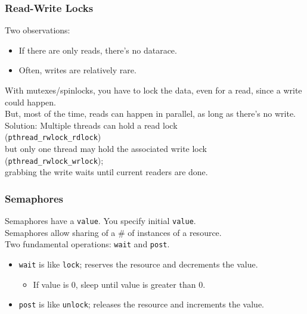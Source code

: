 \documentclass[aspectratio=43]{beamer}
\newenvironment{changemargin}[1]{%
  \begin{list}{}{%
    \setlength{\topsep}{0pt}%
    \setlength{\leftmargin}{#1}%
    \setlength{\rightmargin}{1em}
    \setlength{\listparindent}{\parindent}%
    \setlength{\itemindent}{\parindent}%
    \setlength{\parsep}{\parskip}%
  }%
  \item[]}{\end{list}}
\begin{document}
\begin{frame}
  \frametitle{Read-Write Locks}

  \begin{changemargin}{2.5cm}
  Two observations:
  \begin{itemize}
    \item If there are only reads, there's no datarace.
    \item Often, writes are relatively rare.
  \end{itemize}
  With mutexes/spinlocks, you have to lock the data, even for a read,
      since a write could happen.\\[1em]

  But, most of the time, reads can happen in parallel, as long as
      there's no write.\\[1em]

  Solution: Multiple threads can hold a read lock\\ \hspace*{2em} ({\tt pthread\_rwlock\_rdlock})\\
      but only one thread may hold the associated write lock\\ \hspace*{2em} ({\tt pthread\_rwlock\_wrlock});\\
      grabbing the write waits until  current readers are done.
  \end{changemargin}
\end{frame}

\begin{frame}
  \frametitle{Semaphores}

  \begin{changemargin}{2cm}
    Semaphores have a {\tt value}.
      You specify initial {\tt value}.\\[1em]
    Semaphores allow sharing of a \# of instances of a resource.\\[1em]
    Two fundamental operations: {\tt wait} and {\tt post}.\\[1em]
  \begin{itemize}
    \item {\tt wait} is like {\tt lock}; reserves the resource and decrements the value.
      \begin{itemize}
        \item If value is 0, sleep until value is greater than 0.
      \end{itemize}
    \item {\tt post} is like {\tt unlock}; releases the resource and increments the value.
  \end{itemize}
  \end{changemargin}
\end{frame}
\end{document}
